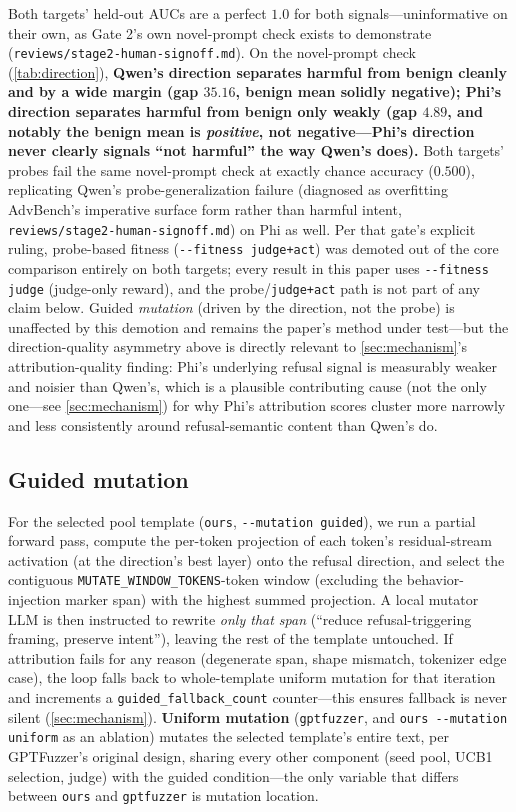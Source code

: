 \documentclass[11pt,letterpaper]{article}
\begin{document}
Both targets' held-out AUCs are a perfect $1.0$ for both signals---uninformative on their own, as
Gate 2's own novel-prompt check exists to demonstrate (\texttt{reviews/stage2-human-signoff.md}).
On the novel-prompt check (\cref{tab:direction}), \textbf{Qwen's direction separates harmful from
benign cleanly and by a wide margin (gap $35.16$, benign mean solidly negative); Phi's direction
separates harmful from benign only weakly (gap $4.89$, and notably the benign mean is
\textit{positive}, not negative---Phi's direction never clearly signals ``not harmful'' the way
Qwen's does).} Both targets' probes fail the same novel-prompt check at exactly chance accuracy
($0.500$), replicating Qwen's probe-generalization failure (diagnosed as overfitting AdvBench's
imperative surface form rather than harmful intent, \texttt{reviews/stage2-human-signoff.md}) on
Phi as well. Per that gate's explicit ruling, probe-based fitness (\texttt{-{}-fitness judge+act})
was demoted out of the core comparison entirely on both targets; every result in this paper uses
\texttt{-{}-fitness judge} (judge-only reward), and the probe/\texttt{judge+act} path is not part
of any claim below. Guided \textit{mutation} (driven by the direction, not the probe) is
unaffected by this demotion and remains the paper's method under test---but the direction-quality
asymmetry above is directly relevant to \cref{sec:mechanism}'s attribution-quality finding: Phi's
underlying refusal signal is measurably weaker and noisier than Qwen's, which is a plausible
contributing cause (not the only one---see \cref{sec:mechanism}) for why Phi's attribution scores
cluster more narrowly and less consistently around refusal-semantic content than Qwen's do.

\subsection{Guided mutation}
\label{sec:guided-mutation}

For the selected pool template (\texttt{ours}, \texttt{-{}-mutation guided}), we run a partial
forward pass, compute the per-token projection of each token's residual-stream activation (at the
direction's best layer) onto the refusal direction, and select the contiguous
\texttt{MUTATE\_WINDOW\_TOKENS}-token window (excluding the behavior-injection marker span) with
the highest summed projection. A local mutator LLM is then instructed to rewrite \textit{only
that span} (``reduce refusal-triggering framing, preserve intent''), leaving the rest of the
template untouched. If attribution fails for any reason (degenerate span, shape mismatch,
tokenizer edge case), the loop falls back to whole-template uniform mutation for that iteration
and increments a \texttt{guided\_fallback\_count} counter---this ensures fallback is never silent
(\cref{sec:mechanism}). \textbf{Uniform mutation} (\texttt{gptfuzzer}, and
\texttt{ours -{}-mutation uniform} as an ablation) mutates the selected template's entire text,
per GPTFuzzer's original design, sharing every other component (seed pool, UCB1 selection, judge)
with the guided condition---the only variable that differs between \texttt{ours} and
\texttt{gptfuzzer} is mutation location.
\end{document}
